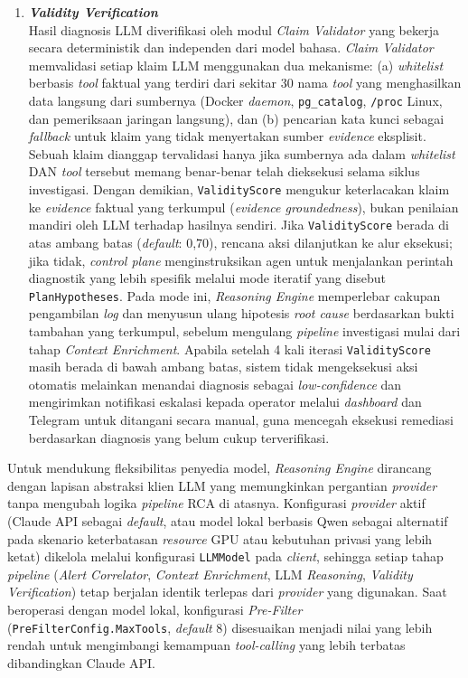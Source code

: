 \begin{enumerate}[label=\arabic*., leftmargin=*]
  \item \textbf{\textit{Validity Verification}}\\
        Hasil diagnosis LLM diverifikasi oleh modul \textit{Claim Validator} yang bekerja secara deterministik dan independen dari model bahasa. \textit{Claim Validator} memvalidasi setiap klaim LLM menggunakan dua mekanisme: (a) \textit{whitelist} berbasis \textit{tool} faktual yang terdiri dari sekitar 30 nama \textit{tool} yang menghasilkan data langsung dari sumbernya (Docker \textit{daemon}, \texttt{pg\_catalog}, \texttt{/proc} Linux, dan pemeriksaan jaringan langsung), dan (b) pencarian kata kunci sebagai \textit{fallback} untuk klaim yang tidak menyertakan sumber \textit{evidence} eksplisit. Sebuah klaim dianggap tervalidasi hanya jika sumbernya ada dalam \textit{whitelist} DAN \textit{tool} tersebut memang benar-benar telah dieksekusi selama siklus investigasi. Dengan demikian, \texttt{ValidityScore} mengukur keterlacakan klaim ke \textit{evidence} faktual yang terkumpul (\textit{evidence groundedness}), bukan penilaian mandiri oleh LLM terhadap hasilnya sendiri. Jika \texttt{ValidityScore} berada di atas ambang batas (\textit{default}: 0,70), rencana aksi dilanjutkan ke alur eksekusi; jika tidak, \textit{control plane} menginstruksikan agen untuk menjalankan perintah diagnostik yang lebih spesifik melalui mode iteratif yang disebut \texttt{PlanHypotheses}. Pada mode ini, \textit{Reasoning Engine} memperlebar cakupan pengambilan \textit{log} dan menyusun ulang hipotesis \textit{root cause} berdasarkan bukti tambahan yang terkumpul, sebelum mengulang \textit{pipeline} investigasi mulai dari tahap \textit{Context Enrichment}. Apabila setelah 4 kali iterasi \texttt{ValidityScore} masih berada di bawah ambang batas, sistem tidak mengeksekusi aksi otomatis melainkan menandai diagnosis sebagai \textit{low-confidence} dan mengirimkan notifikasi eskalasi kepada operator melalui \textit{dashboard} dan Telegram untuk ditangani secara manual, guna mencegah eksekusi remediasi berdasarkan diagnosis yang belum cukup terverifikasi.
\end{enumerate}

Untuk mendukung fleksibilitas penyedia model, \textit{Reasoning Engine} dirancang dengan lapisan abstraksi klien LLM yang memungkinkan pergantian \textit{provider} tanpa mengubah logika \textit{pipeline} RCA di atasnya. Konfigurasi \textit{provider} aktif (Claude API sebagai \textit{default}, atau model lokal berbasis Qwen sebagai alternatif pada skenario keterbatasan \textit{resource} GPU atau kebutuhan privasi yang lebih ketat) dikelola melalui konfigurasi \texttt{LLMModel} pada \textit{client}, sehingga setiap tahap \textit{pipeline} (\textit{Alert Correlator}, \textit{Context Enrichment}, LLM \textit{Reasoning}, \textit{Validity Verification}) tetap berjalan identik terlepas dari \textit{provider} yang digunakan. Saat beroperasi dengan model lokal, konfigurasi \textit{Pre-Filter} (\texttt{PreFilterConfig.MaxTools}, \textit{default} 8) disesuaikan menjadi nilai yang lebih rendah untuk mengimbangi kemampuan \textit{tool-calling} yang lebih terbatas dibandingkan Claude API.

